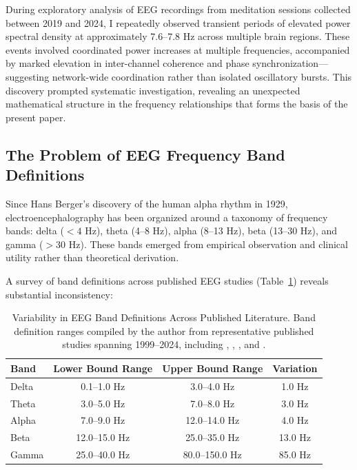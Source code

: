 \documentclass[11pt,a4paper]{article}
\begin{document}
During exploratory analysis of EEG recordings from meditation sessions collected between 2019 and 2024, I repeatedly observed transient periods of elevated power spectral density at approximately 7.6--7.8 Hz across multiple brain regions. These events involved coordinated power increases at multiple frequencies, accompanied by marked elevation in inter-channel coherence and phase synchronization---suggesting network-wide coordination rather than isolated oscillatory bursts. This discovery prompted systematic investigation, revealing an unexpected mathematical structure in the frequency relationships that forms the basis of the present paper.

\subsection{The Problem of EEG Frequency Band Definitions}

Since Hans Berger's discovery of the human alpha rhythm in 1929, electroencephalography has been organized around a taxonomy of frequency bands: delta ($<4$ Hz), theta (4--8 Hz), alpha (8--13 Hz), beta (13--30 Hz), and gamma ($>30$ Hz). These bands emerged from empirical observation and clinical utility rather than theoretical derivation.

A survey of band definitions across published EEG studies (Table~\ref{tab:band_variability}) reveals substantial inconsistency:

\begin{table}[H]
\centering
\caption{Variability in EEG Band Definitions Across Published Literature. Band definition ranges compiled by the author from representative published studies spanning 1999--2024, including \textcite{wolfgang_klimesch_be1f7786}, \textcite{gy_rgy_buzs_ki_c98dac5c}, \textcite{cohen2017where}, and \textcite{herrmann2016eeg}.}
\label{tab:band_variability}
\begin{tabular}{@{}lccc@{}}
\toprule
Band & Lower Bound Range & Upper Bound Range & Variation \\
\midrule
Delta & 0.1--1.0 Hz & 3.0--4.0 Hz & 1.0 Hz \\
Theta & 3.0--5.0 Hz & 7.0--8.0 Hz & 3.0 Hz \\
Alpha & 7.0--9.0 Hz & 12.0--14.0 Hz & 4.0 Hz \\
Beta & 12.0--15.0 Hz & 25.0--35.0 Hz & 13.0 Hz \\
Gamma & 25.0--40.0 Hz & 80.0--150.0 Hz & 85.0 Hz \\
\bottomrule
\end{tabular}
\end{table}
\end{document}
